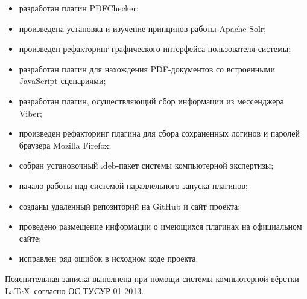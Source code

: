 \begin{itemize}
  \item разработан плагин PDFChecker;
  \item произведена установка и изучение принципов работы Apache Solr; 
  \item произведен рефакторинг графического интерфейса пользователя системы;
  \item разработан плагин для нахождения PDF-документов со встроенными JavaScript-сценариями;
  \item разработан плагин, осуществляющий сбор информации из мессенджера Viber;  
  \item произведен рефакторинг плагина для сбора сохраненных логинов и паролей браузера Mozilla Firefox;  
  \item собран установочный .deb-пакет системы компьютерной экспертизы;  
  \item начало работы над системой параллельного запуска плагинов; 
  \item созданы удаленный репозиторий на GitHub и сайт проекта;  
  \item проведено размещение информации о имеющихся плагинах на официальном сайте;
  \item исправлен ряд ошибок в исходном коде проекта.
\end{itemize}

Пояснительная записка выполнена при помощи системы компьютерной вёрстки \LaTeX\ согласно ОС ТУСУР 01-2013.~\cite{ostusur}
